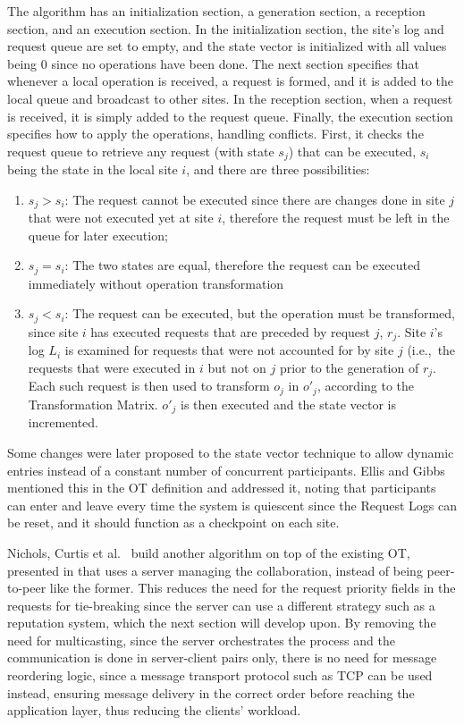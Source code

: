 The algorithm has an initialization section, a generation section, a reception section, and an execution section.
In the initialization section, the site's log and request queue are set to empty, and the state vector is initialized with all values being 0 since no operations have been done. The next section specifies that whenever a local operation is received, a request is formed, and it is added to the local queue and broadcast to other sites. In the reception section, when a request is received, it is simply added to the request queue. Finally, the execution section specifies how to apply the operations, handling conflicts. First, it checks the request queue to retrieve any request (with state $s_j$) that can be executed, $s_i$ being the state in the local site $i$, and there are three possibilities:

\begin{enumerate}
    \item $s_j > s_i$: The request cannot be executed since there are changes done in site $j$ that were not executed yet at site $i$, therefore the request must be left in the queue for later execution;
    \item $s_j = s_i$: The two states are equal, therefore the request can be executed immediately without operation transformation
    \item $s_j < s_i$: The request can be executed, but the operation must be transformed, since site $i$ has executed requests that are preceded by request $j$, $r_j$. Site $i$'s log $L_i$ is examined for requests that were not accounted for by site $j$ (i.e.,\ the requests that were executed in $i$ but not on $j$ prior to the generation of $r_j$. Each such request is then used to transform $o_j$ in $o'_j$, according to the Transformation Matrix. $o'_j$ is then executed and the state vector is incremented.
\end{enumerate}

Some changes were later proposed to the state vector technique \cite{Landes2006} \cite{Almeida2008} to allow dynamic entries instead of a constant number of concurrent participants. Ellis and Gibbs \cite{Ellis1989} mentioned this in the OT definition and addressed it, noting that participants can enter and leave every time the system is quiescent since the Request Logs can be reset, and it should function as a checkpoint on each site.

Nichols, Curtis et al.\ \cite{Nichols1995} build another algorithm on top of the existing OT, presented in \cite{Ellis1989} that uses a server managing the collaboration, instead of being peer-to-peer like the former. This reduces the need for the request priority fields in the requests for tie-breaking since the server can use a different strategy such as a reputation system, which the next section will develop upon. By removing the need for multicasting, since the server orchestrates the process and the communication is done in server-client pairs only, there is no need for message reordering logic, since a message transport protocol such as TCP \cite{tcpprotocol} can be used instead, ensuring message delivery in the correct order before reaching the application layer, thus reducing the clients' workload.

